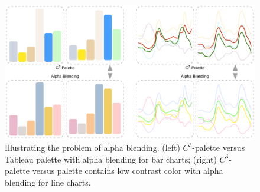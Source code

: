 \documentclass[review,onecolumn]{vgtc}                %
\begin{document}
\begin{figure}[ht]
\centering
\includegraphics[width=0.96\linewidth]{badcaseAB.pdf}
\caption{Illustrating the problem of alpha blending. (left) $C^3$-palette versus Tableau palette with alpha blending for bar charts; (right) $C^3$-palette versus palette contains low contrast color with alpha blending for line charts.}
\vspace*{-3mm}
\label{fig:badcaseAB}
\end{figure}



\end{document}
